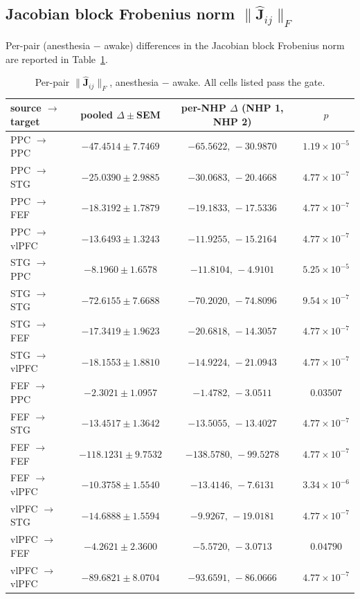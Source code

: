 \subsection*{Jacobian block Frobenius norm $\|\hat{\mathbf{J}}_{ij}\|_{F}$}\label{supp:interareal-control-tab-fro}

Per-pair (anesthesia $-$ awake) differences in the Jacobian block Frobenius norm are reported in Table~\ref{tab:supp-interareal-control-fro}.

\begin{table}[h!]
\centering
\small
\caption[Per-pair Jacobian block Frobenius norm]{Per-pair $\|\hat{\mathbf{J}}_{ij}\|_{F}$, anesthesia $-$ awake. All cells listed pass the gate.}
\label{tab:supp-interareal-control-fro}
\begin{tabular}{lccc}
\toprule
source $\to$ target & pooled $\Delta\pm$SEM & per-NHP $\Delta$ (NHP 1, NHP 2) & $p$ \\
\midrule
PPC $\to$ PPC   & $-47.4514\pm 7.7469$ & $-65.5622,\,-30.9870$ & $1.19\!\times\!10^{-5}$ \\
PPC $\to$ STG   & $-25.0390\pm 2.9885$ & $-30.0683,\,-20.4668$ & $4.77\!\times\!10^{-7}$ \\
PPC $\to$ FEF   & $-18.3192\pm 1.7879$ & $-19.1833,\,-17.5336$ & $4.77\!\times\!10^{-7}$ \\
PPC $\to$ vlPFC & $-13.6493\pm 1.3243$ & $-11.9255,\,-15.2164$ & $4.77\!\times\!10^{-7}$ \\
STG $\to$ PPC   & $-8.1960\pm 1.6578$ & $-11.8104,\,-4.9101$ & $5.25\!\times\!10^{-5}$ \\
STG $\to$ STG   & $-72.6155\pm 7.6688$ & $-70.2020,\,-74.8096$ & $9.54\!\times\!10^{-7}$ \\
STG $\to$ FEF   & $-17.3419\pm 1.9623$ & $-20.6818,\,-14.3057$ & $4.77\!\times\!10^{-7}$ \\
STG $\to$ vlPFC & $-18.1553\pm 1.8810$ & $-14.9224,\,-21.0943$ & $4.77\!\times\!10^{-7}$ \\
FEF $\to$ PPC   & $-2.3021\pm 1.0957$ & $-1.4782,\,-3.0511$ & $0.03507$ \\
FEF $\to$ STG   & $-13.4517\pm 1.3642$ & $-13.5055,\,-13.4027$ & $4.77\!\times\!10^{-7}$ \\
FEF $\to$ FEF   & $-118.1231\pm 9.7532$ & $-138.5780,\,-99.5278$ & $4.77\!\times\!10^{-7}$ \\
FEF $\to$ vlPFC & $-10.3758\pm 1.5540$ & $-13.4146,\,-7.6131$ & $3.34\!\times\!10^{-6}$ \\
vlPFC $\to$ STG & $-14.6888\pm 1.5594$ & $-9.9267,\,-19.0181$ & $4.77\!\times\!10^{-7}$ \\
vlPFC $\to$ FEF & $-4.2621\pm 2.3600$ & $-5.5720,\,-3.0713$ & $0.04790$ \\
vlPFC $\to$ vlPFC & $-89.6821\pm 8.0704$ & $-93.6591,\,-86.0666$ & $4.77\!\times\!10^{-7}$ \\
\bottomrule
\end{tabular}
\end{table}


